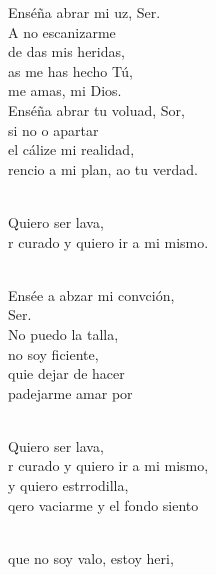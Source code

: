 \begin{cancion}[Resucitados][]%
	Enséña abrar mi uz, Ser. \\
	A no escanizarme \\
	de das mis heridas, \\
	as me has hecho Tú, \\
	 me amas, mi Dios.  \\
\jump
	Enséña abrar tu voluad, Sor,  \\
	si no o apartar \\
	el cálize mi realidad, \\
	rencio a mi plan, ao tu verdad. \\\jump\\
	\begin{chorus}%
	Quiero  ser lava, \\
	r curado y quiero ir a mi mismo. \\
	\end{chorus}%
	\jump\\
	Ensée a abzar mi convción, \\
	Ser. \\
	No puedo la talla, \\
	no soy ficiente, \\
	quie dejar de hacer \\
	padejarme amar por  \\\jump\\
	\begin{chorus}%
	Quiero  ser lava, \\
	r curado y quiero ir a mi mismo, \\
	y quiero estrrodilla,  \\
	qero vaciarme y el fondo siento\\
	\end{chorus}%
	\jump\\
	que no soy valo, estoy heri, \\

\end{cancion}
